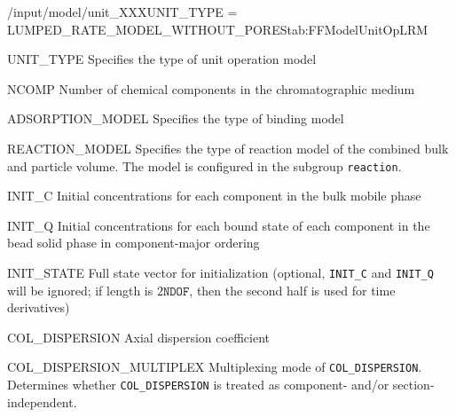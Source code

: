 \begin{condsubgroup}{/input/model/unit\_XXX}{UNIT\_TYPE = LUMPED\_RATE\_MODEL\_WITHOUT\_PORES}{tab:FFModelUnitOpLRM}
  \begin{dataset}[type=string,range={\texttt{LUMPED\_RATE\_MODEL\_WITHOUT\_PORES}},length=1]{UNIT\_TYPE}
    Specifies the type of unit operation model
  \end{dataset}
  \begin{dataset}[type=int,range={$\geq 1$},length=1]{NCOMP}
    Number of chemical components in the chromatographic medium
  \end{dataset}
  \begin{dataset}[type=string,range={See Section~\ref{sec:FFAdsorption}},length=1]{ADSORPTION\_MODEL}
    Specifies the type of binding model
  \end{dataset}
  \begin{dataset}[type=string,range={See Section~\ref{sec:FFReaction}},length=1]{REACTION\_MODEL}
    Specifies the type of reaction model of the combined bulk and particle volume.
    The model is configured in the subgroup \texttt{reaction}.
  \end{dataset}
  \begin{dataset}[unit=\si{\mol\per\cubic\metre\of{IV}},type=double,range={$\geq 0$},length={\texttt{NCOMP}}]{INIT\_C}
    Initial concentrations for each component in the bulk mobile phase
  \end{dataset}
  \begin{dataset}[unit=\si{\mol\per\cubic\metre\of{SP}},type=double,range={$\geq 0$},length={\texttt{NTOTALBND}}]{INIT\_Q}
    Initial concentrations for each bound state of each component in the bead solid phase in component-major ordering
  \end{dataset}
  \begin{dataset}[unit=various,type=double,range={$\mathds{R}$},length={\texttt{NDOF} / $2\texttt{NDOF}$}]{INIT\_STATE}
    Full state vector for initialization (optional, \texttt{INIT\_C} and \texttt{INIT\_Q} will be ignored; if length is $2\texttt{NDOF}$, then the second half is used for time derivatives)
  \end{dataset}
  \begin{dataset}[unit=\si{\square\metre\of{IV}\per\second},type=double,range={$\geq 0$},length={see \texttt{COL\_DISPERSION\_MULTIPLEX}}]{COL\_DISPERSION}
    Axial dispersion coefficient
  \end{dataset}
  \begin{dataset}[unit=--,type=int,range={$\{0, \dots, 3 \}$},length={1}]{COL\_DISPERSION\_MULTIPLEX}
    Multiplexing mode of \texttt{COL\_DISPERSION}.
    Determines whether \texttt{COL\_DISPERSION} is treated as component- and/or section-independent.


\end{dataset}
\end{condsubgroup}
